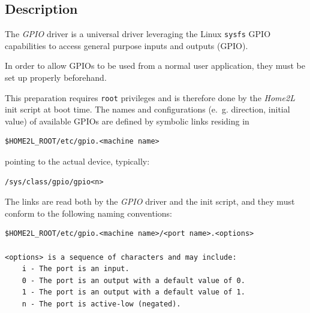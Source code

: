 \documentclass[12pt,english,parskip=half]{scrreprt}
\begin{document}
\subsection{Description}
\label{sec:drvlib-gpio-description}


The \emph{GPIO} driver is a universal driver leveraging the Linux \texttt{sysfs}
GPIO capabilities to access general purpose inputs and outputs (GPIO).

In order to allow GPIOs to be used from a normal user application, they
must be set up properly beforehand. 

This preparation requires \texttt{root} privileges and is therefore
done by the \emph{Home2L} init script at boot time.
The names and configurations (e.~g. direction, initial
value) of available GPIOs are defined by symbolic links residing in

\begin{lstlisting}
$HOME2L_ROOT/etc/gpio.<machine name>
\end{lstlisting}

pointing to the actual device, typically:

\begin{lstlisting}
/sys/class/gpio/gpio<n>
\end{lstlisting}

The links are read both by the \emph{GPIO} driver and the init script,
and they must conform to the following naming conventions:

\begin{lstlisting}
$HOME2L_ROOT/etc/gpio.<machine name>/<port name>.<options>

<options> is a sequence of characters and may include:
    i - The port is an input.
    0 - The port is an output with a default value of 0.
    1 - The port is an output with a default value of 1.
    n - The port is active-low (negated).
\end{lstlisting}





%
%
%
%
\end{document}
